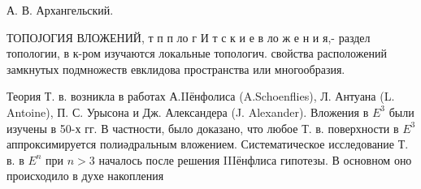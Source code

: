 \documentclass[10pt]{article}
\begin{document}
А. В. Архангельский.



ТОПОЈОГИЯ ВЛОЖЕНИЙ, т п п ло г И т с к и е в ло ж е н и я,- раздел топологии, в к-ром изучаются локальные топологич. свойства расположений замкнутых подмножеств евклидова пространства или многообразия.



Теория Т. в. возникла в работах А.IIёнфолиса (A.Schoenflies), Л. Антуана (L. Antoine), П. С. Урысона и Дж. Александера (J. Alexander). Вложения в $E^{3}$ были изучены в 50-х гг. В частности, было доказано, что любое Т. в. поверхности в $E^{3}$ аппроксимируется полиәдральным вложением. Систематическое исследование Т. в. в $E^{n}$ при $n>3$ началось после решения IIIёнфлиса гипотезы. В основном оно происходило в духе накопления
\end{document}
